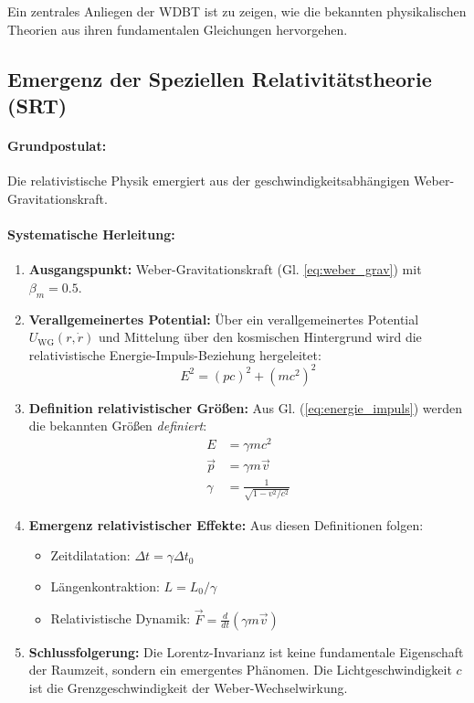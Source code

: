 \documentclass[11pt, a4paper]{article}
\begin{document}
Ein zentrales Anliegen der WDBT ist zu zeigen, wie die bekannten physikalischen Theorien aus ihren fundamentalen Gleichungen hervorgehen.

\subsection{Emergenz der Speziellen Relativitätstheorie (SRT)}
\label{subsec:emergenz_srt}

\paragraph{Grundpostulat:} Die relativistische Physik emergiert aus der geschwindigkeitsabhängigen Weber-Gravitationskraft.

\paragraph{Systematische Herleitung:}
\begin{enumerate}
    \item \textbf{Ausgangspunkt:} Weber-Gravitationskraft (Gl. \ref{eq:weber_grav}) mit $\beta_m = 0.5$.
    \item \textbf{Verallgemeinertes Potential:} Über ein verallgemeinertes Potential $U_{\text{WG}}(r, \dot{r})$ und Mittelung über den kosmischen Hintergrund wird die relativistische Energie-Impuls-Beziehung hergeleitet:
    \begin{equation}
    \label{eq:energie_impuls}
    E^2 = (p c)^2 + (m c^2)^2
    \end{equation}
    \item \textbf{Definition relativistischer Größen:} Aus Gl. (\ref{eq:energie_impuls}) werden die bekannten Größen \textit{definiert}:
    \begin{align}
    E &= \gamma m c^2 \\
    \vec{p} &= \gamma m \vec{v} \\
    \gamma &= \frac{1}{\sqrt{1 - v^2/c^2}}
    \end{align}
    \item \textbf{Emergenz relativistischer Effekte:} Aus diesen Definitionen folgen:
    \begin{itemize}
        \item Zeitdilatation: $\Delta t = \gamma \Delta t_0$
        \item Längenkontraktion: $L = L_0 / \gamma$
        \item Relativistische Dynamik: $\vec{F} = \frac{d}{dt}(\gamma m \vec{v})$
    \end{itemize}
    \item \textbf{Schlussfolgerung:} Die Lorentz-Invarianz ist keine fundamentale Eigenschaft der Raumzeit, sondern ein emergentes Phänomen. Die Lichtgeschwindigkeit $c$ ist die Grenzgeschwindigkeit der Weber-Wechselwirkung.
\end{enumerate}
\end{document}
